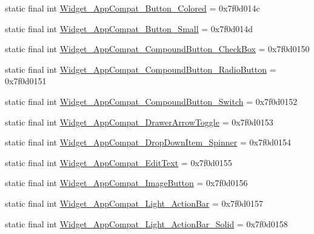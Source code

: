 \begin{DoxyCompactItemize}
\item 
static final int \mbox{\hyperlink{classandroid_1_1support_1_1design_1_1R_1_1style_a6e4a95d74c2cb6caf6c4bb7117fbae5e}{Widget\+\_\+\+App\+Compat\+\_\+\+Button\+\_\+\+Colored}} = 0x7f0d014c
\item 
static final int \mbox{\hyperlink{classandroid_1_1support_1_1design_1_1R_1_1style_a7e35f1376266e8260468088a0dca3b78}{Widget\+\_\+\+App\+Compat\+\_\+\+Button\+\_\+\+Small}} = 0x7f0d014d
\item 
static final int \mbox{\hyperlink{classandroid_1_1support_1_1design_1_1R_1_1style_a3ea8e6eb9033a7701d539035be6c7f9a}{Widget\+\_\+\+App\+Compat\+\_\+\+Compound\+Button\+\_\+\+Check\+Box}} = 0x7f0d0150
\item 
static final int \mbox{\hyperlink{classandroid_1_1support_1_1design_1_1R_1_1style_abad9a39b0d877fc07bdd7f7823a25796}{Widget\+\_\+\+App\+Compat\+\_\+\+Compound\+Button\+\_\+\+Radio\+Button}} = 0x7f0d0151
\item 
static final int \mbox{\hyperlink{classandroid_1_1support_1_1design_1_1R_1_1style_a6d4a76cafe643b9126d663dae6395ae0}{Widget\+\_\+\+App\+Compat\+\_\+\+Compound\+Button\+\_\+\+Switch}} = 0x7f0d0152
\item 
static final int \mbox{\hyperlink{classandroid_1_1support_1_1design_1_1R_1_1style_ace6cb78b063c9c92ae071d282010bb37}{Widget\+\_\+\+App\+Compat\+\_\+\+Drawer\+Arrow\+Toggle}} = 0x7f0d0153
\item 
static final int \mbox{\hyperlink{classandroid_1_1support_1_1design_1_1R_1_1style_a875e226c161599fb44f162ca86831ab9}{Widget\+\_\+\+App\+Compat\+\_\+\+Drop\+Down\+Item\+\_\+\+Spinner}} = 0x7f0d0154
\item 
static final int \mbox{\hyperlink{classandroid_1_1support_1_1design_1_1R_1_1style_aa14bb02b82d02a1100e32ae372882cab}{Widget\+\_\+\+App\+Compat\+\_\+\+Edit\+Text}} = 0x7f0d0155
\item 
static final int \mbox{\hyperlink{classandroid_1_1support_1_1design_1_1R_1_1style_a54f517f252b1f57ad368bffa0b53d903}{Widget\+\_\+\+App\+Compat\+\_\+\+Image\+Button}} = 0x7f0d0156
\item 
static final int \mbox{\hyperlink{classandroid_1_1support_1_1design_1_1R_1_1style_a931e5804532cff8dfa368268461dff2d}{Widget\+\_\+\+App\+Compat\+\_\+\+Light\+\_\+\+Action\+Bar}} = 0x7f0d0157
\item 
static final int \mbox{\hyperlink{classandroid_1_1support_1_1design_1_1R_1_1style_a839a83b5abd51f1a0511646f9e60061f}{Widget\+\_\+\+App\+Compat\+\_\+\+Light\+\_\+\+Action\+Bar\+\_\+\+Solid}} = 0x7f0d0158

\end{DoxyCompactItemize}
